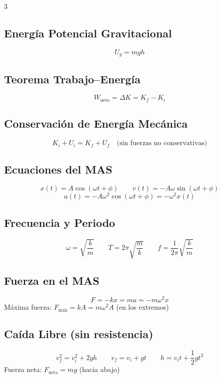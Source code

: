 \documentclass[10pt,landscape]{article}
\begin{document}
\begin{multicols}{3}
\subsection*{Energ\'{i}a Potencial Gravitacional}
\[
\boxed{U_g = mgh}
\]

\subsection*{Teorema Trabajo--Energ\'{i}a}
\[
\boxed{W_{\text{neto}} = \Delta K = K_f - K_i}
\]

\subsection*{Conservaci\'{o}n de Energ\'{i}a Mec\'{a}nica}
\[
\boxed{K_i + U_i = K_f + U_f} \quad \text{(sin fuerzas no conservativas)}
\]

\vspace{4pt}

\subsection*{Ecuaciones del MAS}
\[
x(t) = A\cos(\omega t + \phi) \qquad v(t) = -A\omega\sin(\omega t + \phi)
\]
\[
a(t) = -A\omega^2\cos(\omega t + \phi) = -\omega^2 x(t)
\]

\subsection*{Frecuencia y Periodo}
\[
\boxed{\omega = \sqrt{\frac{k}{m}}} \qquad \boxed{T = 2\pi\sqrt{\frac{m}{k}}} \qquad \boxed{f = \frac{1}{2\pi}\sqrt{\frac{k}{m}}}
\]

\subsection*{Fuerza en el MAS}
\[
\boxed{F = -kx = ma = -m\omega^2 x}
\]
M\'{a}xima fuerza: $F_{\text{m\'{a}x}} = kA = m\omega^2 A$ (en los extremos)

\vspace{4pt}

\subsection*{Ca\'{i}da Libre (sin resistencia)}
\[
\boxed{v_f^2 = v_i^2 + 2gh} \qquad \boxed{v_f = v_i + gt} \qquad \boxed{h = v_i t + \frac{1}{2}gt^2}
\]
Fuerza neta: $F_{\text{neta}} = mg$ (hacia abajo)


\end{multicols}
\end{document}
